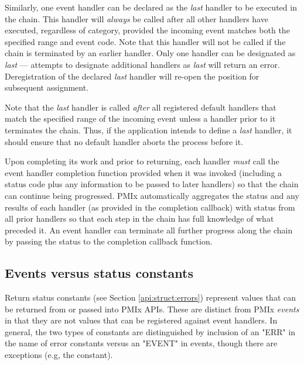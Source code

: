 Similarly, one event handler can be declared as the \textit{last} handler to be executed in the chain. This handler will \textit{always} be called after all other handlers have executed, regardless of category, provided the incoming event matches both the specified range and event code. Note that this handler will not be called if the chain is terminated by an earlier handler. Only one handler can be designated as \textit{last} --- attempts to designate additional handlers as \textit{last} will return an error. Deregistration of the declared \textit{last} handler will re-open the position for subsequent assignment.

\adviceuserstart
Note that the \textit{last} handler is called \textit{after} all registered default handlers that match the specified range of the incoming event unless a handler prior to it terminates the chain. Thus, if the application intends to define a \textit{last} handler, it should ensure that no default handler aborts the process before it.
\adviceuserend

Upon completing its work and prior to returning, each handler \textit{must} call the event handler completion function provided when it was invoked (including a status code plus any information to be passed to later handlers) so that the chain can continue being progressed. \ac{PMIx} automatically aggregates the status and any results of each handler (as provided in the completion callback) with status from all prior handlers so that each step in the chain has full knowledge of what preceded it. An event handler can terminate all further progress along the chain by passing the  status to the completion callback function.

\subsection{Events versus status constants}
\label{api:event:evssc}

Return status constants (see Section \ref{api:struct:errors}) represent values that can be returned from or passed into \ac{PMIx}
\acp{API}. These are distinct from \ac{PMIx} \emph{events} in that they are
not values that can be registered against event handlers. In general, the two
types of constants are distinguished by inclusion of an "ERR" in the name of
error constants versus an "EVENT" in events, though there are exceptions (e.g,
the  constant).


